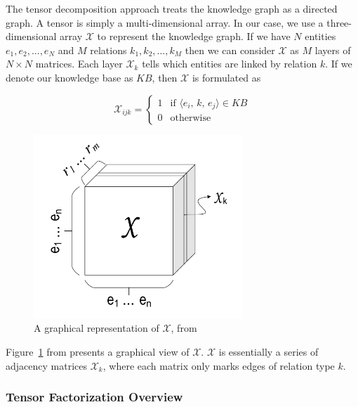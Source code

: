 \documentclass[pageno]{final_paper}
\begin{document}
The tensor decomposition approach treats the knowledge graph as a directed
graph. A tensor is simply a multi-dimensional array. In our case, we use a
three-dimensional array $\mathcal{X}$ to represent the knowledge graph. If we
have $N$ entities $e_1, e_2, ..., e_N$ and $M$ relations $k_1, k_2, ..., k_M$
then we can consider $\mathcal{X}$ as $M$ layers of $N\times N$ matrices. Each
layer $\mathcal{X}_k$ tells which entities are linked by relation $k$. If we
denote our knowledge base as $KB$, then $\mathcal{X}$ is formulated as

$$
\mathcal{X}_{ijk} =
\begin{cases}
    1 & \text{if } \langle e_i,\,k,\,e_j\rangle \in KB \\
    0 & \text{otherwise}
\end{cases}
$$

\begin{figure}[!tb]
    \centering
    \includegraphics[width=0.7\textwidth,keepaspectratio]{figures/tensor_figure.png}
    \caption{A graphical representation of $\mathcal{X}$, from \cite{Chang2014}}
    \label{fig: tensor figure}
\end{figure}

Figure~\ref{fig: tensor figure} from \cite{Chang2014} presents a graphical view
of $\mathcal{X}$. $\mathcal{X}$ is essentially a series of adjacency matrices
$\mathcal{X}_k$, where each matrix only marks edges of relation type $k$. \\

\subsubsection{Tensor Factorization Overview}
\label{Tensor Factorization Overview}
\end{document}

